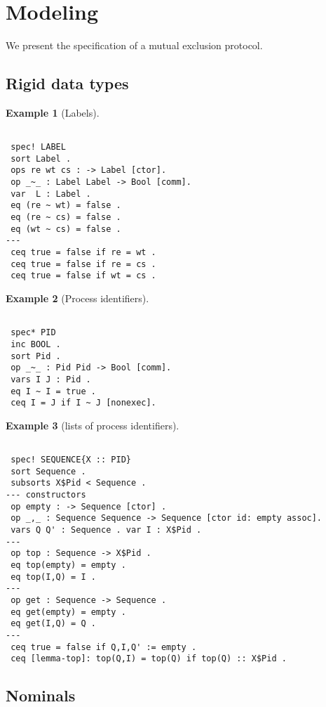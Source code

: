 \documentclass{article}
\newtheorem{example}{Example}
\begin{document}
\section{Modeling}
We present the specification of a mutual exclusion protocol.
\subsection{Rigid data types}

\begin{example}[Labels]
 \begin{verbatim}
 
 spec! LABEL
 sort Label .
 ops re wt cs : -> Label [ctor].
 op _~_ : Label Label -> Bool [comm].
 var  L : Label .
 eq (re ~ wt) = false .
 eq (re ~ cs) = false .
 eq (wt ~ cs) = false .
---
 ceq true = false if re = wt .
 ceq true = false if re = cs .
 ceq true = false if wt = cs .
\end{verbatim}
\end{example}

\begin{example}[Process identifiers]
\begin{verbatim}

 spec* PID
 inc BOOL .
 sort Pid .
 op _~_ : Pid Pid -> Bool [comm].
 vars I J : Pid .
 eq I ~ I = true .
 ceq I = J if I ~ J [nonexec]. 
\end{verbatim}
\end{example}



\begin{example}[lists of process identifiers] 
\begin{verbatim}
 
 spec! SEQUENCE{X :: PID}
 sort Sequence .
 subsorts X$Pid < Sequence .
--- constructors 
 op empty : -> Sequence [ctor] .
 op _,_ : Sequence Sequence -> Sequence [ctor id: empty assoc].
 vars Q Q' : Sequence . var I : X$Pid .
--- 
 op top : Sequence -> X$Pid .
 eq top(empty) = empty .
 eq top(I,Q) = I .
---
 op get : Sequence -> Sequence .
 eq get(empty) = empty .
 eq get(I,Q) = Q .
---
 ceq true = false if Q,I,Q' := empty .
 ceq [lemma-top]: top(Q,I) = top(Q) if top(Q) :: X$Pid .

\end{verbatim}
\end{example}

\subsection{Nominals}
\end{document}

